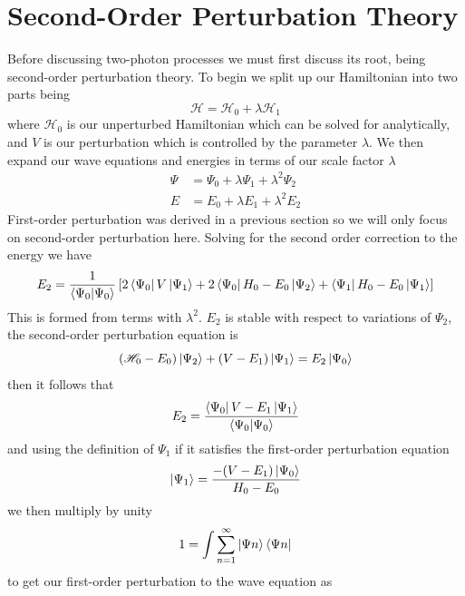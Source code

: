 \section{Second-Order Perturbation Theory}
Before discussing two-photon processes we must first discuss its root, being second-order perturbation theory. To begin we split up our Hamiltonian into two parts being \cite{variational}
\begin{equation}
\mathscr{H}=\mathscr{H}_0+\lambda\mathscr{H}_1
\end{equation}
where $\mathscr{H}_0$ is our unperturbed Hamiltonian which can be solved for analytically, and $V$ is our perturbation which is controlled by the parameter $\lambda$. We then expand our wave equations and energies in terms of our scale factor $\lambda$
\begin{equation}
    \begin{split}
        \Psi&=\Psi_0+\lambda\Psi_1+\lambda^2 \Psi_2\\
        E&=E_0+\lambda E_1+ \lambda^2 E_2
    \end{split}
\end{equation}
First-order perturbation was derived in a previous section so we will only focus on second-order perturbation here. Solving for the second order correction to the energy we have
\begin{equation}
    E_2=\frac{1}{\braket{\Psi_0}{\Psi_0}} \left[ 2\bra{\Psi_0}V\ket{\Psi_1}+2\bra{\Psi_0}H_0-E_0\ket{\Psi_2}+\bra{\Psi_1}H_0-E_0\ket{\Psi_1}\right]
\end{equation}
This is formed from terms with $\lambda^2$. $E_2$ is stable with respect to variations of $\Psi_2$, the second-order perturbation equation is
\begin{equation}
    (\mathscr{H}_0-E_0)\ket{\Psi_2}+ (V-E_1)\ket{\Psi_1}=E_2\ket{\Psi_0}
\end{equation}
then it follows that
\begin{equation}
    E_2=\frac{\bra{\Psi_0}V-E_1\ket{\Psi_1}}{\braket{\Psi_0}{\Psi_0}}
\end{equation}
and using the definition of $\Psi_1$ if it satisfies the first-order perturbation equation
\begin{equation}
    \ket{\Psi_1}= \frac{-(V-E_1)\ket{\Psi_0}}{H_0-E_0}
\end{equation}
we then multiply by unity 
\begin{equation}
    1=\int\sum_{n=1}^\infty \ket{\Psi n}\bra{\Psi n}
\end{equation}
to get our first-order perturbation to the wave equation as
